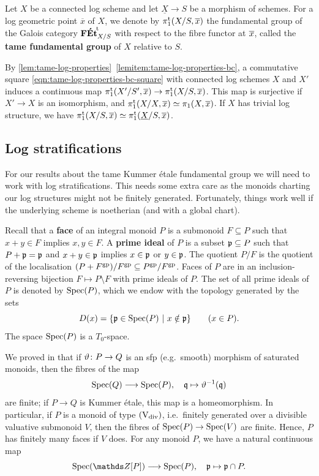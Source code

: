 \begin{defi} \label{def:FKEt-pi1-tame}
    Let $X$ be a connected log scheme and let $\underline{X}\to S$ be a morphism of schemes. For a log geometric point $\overline{x}$ of $X$, we denote by $\pi_1^{\mathrm{t}}(X/S, \overline{x})$ the fundamental group of the Galois category ${\mathbf{F\acute{E}t}}^{\!\mathrm{t}}_{X/S}$ with respect to the fibre functor at $\overline{x}$, called the {\bf tame fundamental group} of $X$ relative to $S$. 
\end{defi}

By \cref{lem:tame-log-properties}~\ref{lemitem:tame-log-properties-bc}, a commutative square \eqref{eqn:tame-log-properties-bc-square} with connected log schemes $X$ and $X'$ induces a continuous map $\pi_1^{\mathrm{t}}(X'/S',\overline{x})\to\pi_1^{\mathrm{t}}(X/S,\overline{x})$. This map is surjective if $X'\to X$ is an isomorphism, and $\pi_1^{\mathrm{t}}(X/X,\overline{x})\simeq \pi_1(X,\overline{x})$. If $X$ has trivial log structure, we have $\pi_1^{\mathrm{t}}(X/S,\overline{x})\simeq \pi_1^{\mathrm{t}}(\underline{X}/S,\overline{x})$.


\subsection{Log stratifications}
\label{ss:log-strat}

For our results about the tame Kummer \'etale fundamental group we will need to work with log stratifications. This needs some extra care as the monoids charting our log structures might not be finitely generated. Fortunately, things work well if the underlying scheme is noetherian (and with a global chart). 

Recall that a {\bf face} of an integral monoid $P$ is a submonoid $F\subseteq P$ such that $x+y\in F$ implies $x, y\in F$. A {\bf prime ideal} of $P$ is a subset ${\mathfrak p}\subseteq P$ such that $P + {\mathfrak p} = {\mathfrak p}$ and $x+y\in {\mathfrak p}$ implies $x\in {\mathfrak p}$ or $y\in {\mathfrak p}$. The quotient $P/F$ is the quotient of the localisation $(P+F^{\rm gp})/F^{\rm gp} \subseteq P^{\rm gp}/F^{\rm gp}$. Faces of $P$ are in an inclusion-reversing bijection $F \mapsto P \setminus F$ with prime ideals of $P$. The set of all prime ideals of $P$ is denoted by $\operatorname{Spec}(P)$, which we endow with the topology generated by the sets
\[
    D(x) = \{{\mathfrak p} \in \operatorname{Spec}(P) \ | \ x \notin {\mathfrak p}\} \qquad (x\in P).
\]
The space $\operatorname{Spec}(P)$ is a $T_0$-space. 

We proved in \cite[Corollary~2.3.3]{AHLS-Log} that if $\vartheta\colon P\to Q$ is an sfp (e.g.\ smooth) morphism of saturated monoids, then the fibres of the map 
\[ 
    \operatorname{Spec}(Q)\longrightarrow \operatorname{Spec}(P), \quad {\mathfrak q} \mapsto \vartheta^{-1}({\mathfrak q})
\]
are finite; if $P\to Q$ is Kummer \'etale, this map is a homeomorphism. In particular, if $P$ is a monoid of type $(\mathrm{V}_{\rm div})$, i.e.\ finitely generated over a divisible valuative submonoid $V$, 
then the fibres of $\operatorname{Spec}(P)\to \operatorname{Spec}(V)$ are finite. Hence, $P$ has finitely many faces if $V$ does. For any monoid $P$, we have a natural continuous map
\begin{equation} \label{eqn:SpecZP-to-SpecP} 
    \Spec(\bZ[P]) \la \Spec(P), \quad \fp \mapsto \fp\cap P.
\end{equation}

